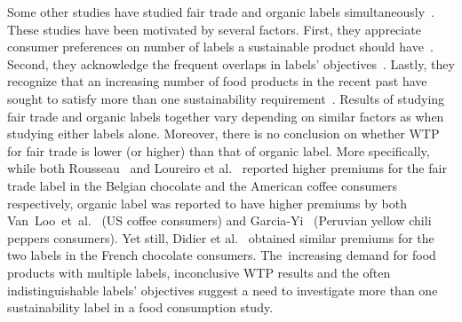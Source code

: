 \documentclass[sustainability,article,accept,moreauthors,pdftex,10pt,a4paper]{Definitions/mdpi}
\theoremstyle{mdpi}
\newcounter{re}
\theoremstyle{mdpidefinition}
\begin{document}
\par{Some other studies have studied fair trade and organic labels simultaneously~\cite{VanLoo2015, Rousseau2015,Loureiro2005,Didier2008,Poelman2008,Annunziata2011,Garcia-Yi2015,Gallenti2016,MEYERDING2016105}. These studies have been motivated by several factors. First, they appreciate consumer preferences on number of labels a sustainable product should have~\cite{ZANDER2010, Tebbe2017Does,Sirieix2013}. Second, they acknowledge the frequent overlaps in labels' objectives~\cite{Reinecke2012}. Lastly, they recognize that an increasing number of food products in the recent past have sought to satisfy more than one sustainability requirement~\cite{pierrot2011}. Results of studying fair trade and organic labels together vary depending on similar factors as when studying either labels alone. Moreover, there is no conclusion on whether WTP for fair trade is lower (or higher) than that of organic label. More specifically, while both Rousseau~\cite{Rousseau2015} and Loureiro et al.~\cite{Loureiro2005} reported higher premiums for the fair trade label in the Belgian chocolate and the American coffee consumers respectively, organic label was reported to have higher premiums by both Van~Loo~et~al.~\cite{VanLoo2015} (US coffee consumers) and Garcia-Yi~\cite{Garcia-Yi2015} (Peruvian yellow chili peppers consumers). Yet still, Didier et al.~\cite{Didier2008} obtained similar premiums for the two labels in the French chocolate consumers. The~increasing demand for food products with multiple labels, inconclusive WTP results and the often indistinguishable labels' objectives suggest a need to investigate more than one sustainability label in a food consumption study.}
\end{document}
